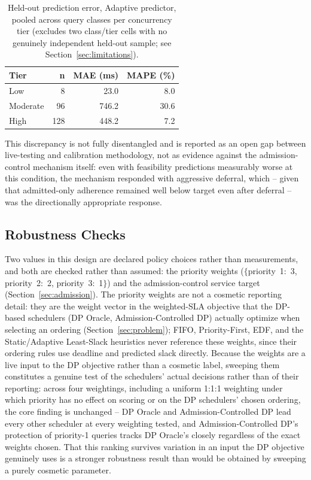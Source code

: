 \documentclass[conference]{IEEEtran}
\begin{document}
\begin{table}[t]
\caption{Held-out prediction error, Adaptive predictor, pooled across query classes per concurrency tier (excludes two class/tier cells with no genuinely independent held-out sample; see Section~\ref{sec:limitations}).}
\label{tab:prediction-error}
\centering
\begin{tabular}{@{}lrrr@{}}
\toprule
\textbf{Tier} & \textbf{n} & \textbf{MAE (ms)} & \textbf{MAPE (\%)} \\
\midrule
Low & 8 & 23.0 & 8.0 \\
Moderate & 96 & 746.2 & 30.6 \\
High & 128 & 448.2 & 7.2 \\
\bottomrule
\end{tabular}
\end{table}

This discrepancy is not fully disentangled and is reported as an open gap between live-testing and calibration methodology, not as evidence against the admission-control mechanism itself: even with feasibility predictions measurably worse at this condition, the mechanism responded with aggressive deferral, which -- given that admitted-only adherence remained well below target even after deferral -- was the directionally appropriate response.

\subsection{Robustness Checks}
\label{sec:robustness}

Two values in this design are declared policy choices rather than measurements, and both are checked rather than assumed: the priority weights ($\{$priority~1:~3, priority~2:~2, priority~3:~1$\}$) and the admission-control service target (Section~\ref{sec:admission}). The priority weights are not a cosmetic reporting detail: they are the weight vector in the weighted-SLA objective that the DP-based schedulers (DP Oracle, Admission-Controlled DP) actually optimize when selecting an ordering (Section~\ref{sec:problem}); FIFO, Priority-First, EDF, and the Static/Adaptive Least-Slack heuristics never reference these weights, since their ordering rules use deadline and predicted slack directly. Because the weights are a live input to the DP objective rather than a cosmetic label, sweeping them constitutes a genuine test of the schedulers' actual decisions rather than of their reporting: across four weightings, including a uniform 1:1:1 weighting under which priority has no effect on scoring or on the DP schedulers' chosen ordering, the core finding is unchanged -- DP Oracle and Admission-Controlled DP lead every other scheduler at every weighting tested, and Admission-Controlled DP's protection of priority-1 queries tracks DP Oracle's closely regardless of the exact weights chosen. That this ranking survives variation in an input the DP objective genuinely uses is a stronger robustness result than would be obtained by sweeping a purely cosmetic parameter.
\end{document}
